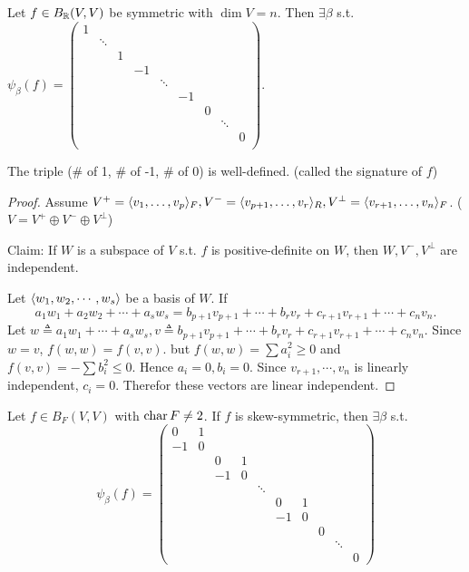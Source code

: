 \begin{theorem}
  Let $f \in B_{\mathbb{R}}(V, V)$ be symmetric with $\dim V = n$. Then $\exists \beta$
  s.t. $\psi_\beta(f) = \begin{pmatrix}
    1 \\
    & \ddots \\
    & & 1 \\
    & & & -1 \\
    & & & & \ddots \\
    & & & & & -1 \\
    & & & & & & 0 \\
    & & & & & & & \ddots \\
    & & & & & & & & 0 \\
  \end{pmatrix}$.

  The triple (\# of 1, \# of -1, \# of 0) is well-defined.
  (called the signature of $f$)
  \begin{proof}


    Assume $V^+ = \langle v_1, \dots, v_p\rangle_F, V^- = \langle v_{p+1}, \dots, v_{r}\rangle_R,
    V^\perp = \langle v_{r+1}, \dots, v_n\rangle_F$. ($V = V^+ \oplus V^- \oplus V^\perp$)

    Claim: If $W$ is a subspace of $V$ s.t. $f$ is positive-definite on $W$,
    then $W, V^-, V^\perp$ are independent.

    Let $\langle w_1, w_2, \cdots, w_s\rangle$ be a basis of $W$. If
    \[ a_1 w_1 + a_2 w_2 + \cdots + a_s w_s = b_{p+1} v_{p+1} + \cdots + b_r v_r + 
      c_{r+1} v_{r+1} + \cdots + c_n v_n. \]
    Let $w \triangleq a_1 w_1 + \cdots + a_s w_s, v \triangleq b_{p+1} v_{p+1} + \cdots + b_r v_r + 
    c_{r+1} v_{r+1} + \cdots + c_n v_n$. Since $w = v$, $f(w, w) = f(v, v)$. 
    but $f(w, w) = \sum a_i^2 \geq 0$ and $f(v, v) = - \sum b_i^2 \leq 0$. Hence $a_i = 0, b_i = 0$.
    Since $v_{r+1}, \cdots, v_n$ is linearly independent, $c_i = 0$. Therefor these vectors are linear 
    independent.

  \end{proof}
\end{theorem}

\begin{exercise}
  Let $f \in B_F(V, V)$ with $\operatorname{char} F \ne 2$.
  If $f$ is skew-symmetric, then $\exists \beta$ s.t.
  \[
    \psi_\beta(f) = \begin{pmatrix}
      0 & 1 \\
      -1 & 0 \\
      & & 0 & 1 \\
      & & -1 & 0 \\
      & & & & \ddots \\
      & & & & & 0 & 1 \\
      & & & & & -1 & 0 \\
      & & & & & & & 0 \\
      & & & & & & & & \ddots \\
      & & & & & & & & & 0
    \end{pmatrix}
  \]
\end{exercise}

